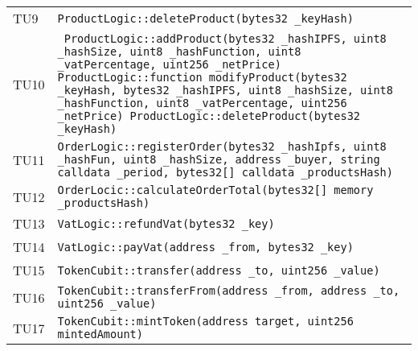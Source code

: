 \begin{longtable}{ >{\centering}p{} >{}p{}}
			\hypertarget{TU9}{TU9} & 
			\texttt{ProductLogic::deleteProduct(bytes32 \_keyHash)}\\
			
			\hypertarget{TU10}{TU10} & \texttt{ 
			ProductLogic::addProduct(bytes32 \_hashIPFS, uint8 \_hashSize, 
			uint8 \_hashFunction, uint8 \_vatPercentage, uint256 
			\_netPrice) \newline
			ProductLogic::function modifyProduct(bytes32 \_keyHash, 
			bytes32 \_hashIPFS, uint8 \_hashSize, uint8 \_hashFunction, uint8 
			\_vatPercentage, uint256 \_netPrice)\newline
			ProductLogic::deleteProduct(bytes32 \_keyHash)}\\
			
			\hypertarget{TU11}{TU11} & 
			\texttt{OrderLogic::registerOrder(bytes32 \_hashIpfs, uint8 
			\_hashFun, uint8 \_hashSize, address \_buyer, string calldata 
			\_period, bytes32[] calldata \_productsHash)}\\
			
			\hypertarget{TU12}{TU12} & 
			\texttt{OrderLocic::calculateOrderTotal(bytes32[] memory 
			\_productsHash)}\\
			
			\hypertarget{TU13}{TU13} & \texttt{VatLogic::refundVat(bytes32 
			\_key)}\\
			
			\hypertarget{TU14}{TU14} & \texttt{VatLogic::payVat(address \_from, 
			bytes32 \_key)}\\
			
			\hypertarget{TU15}{TU15} & \texttt{TokenCubit::transfer(address 
			\_to, uint256 \_value)}\\
			
			\hypertarget{TU16}{TU16} & \texttt{TokenCubit::transferFrom(address 
			\_from, address \_to, uint256 \_value)}\\
			
			\hypertarget{TU17}{TU17} & \texttt{TokenCubit::mintToken(address 
			target, uint256 mintedAmount)}\\
			
			
			
		\end{longtable}
